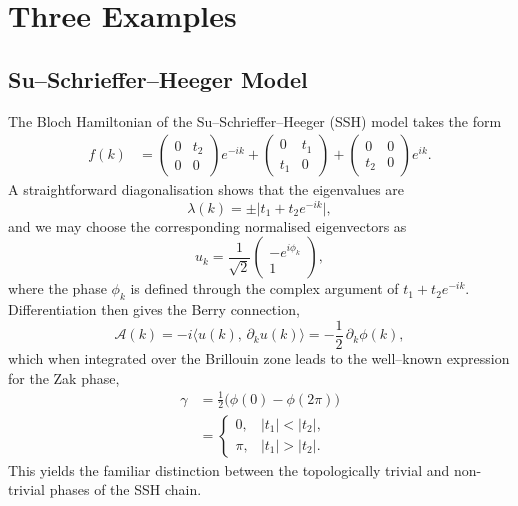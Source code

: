 \documentclass[a4paper,reqno,twoside]{amsart}
\numberwithin{equation}{section}
\theoremstyle{definition}
\newcommand{\<}{\ensuremath \leq}
\renewcommand{\>}{\ensuremath \geq}
\begin{document}
\section{Three Examples}
\subsection{Su–Schrieffer–Heeger Model}
The Bloch Hamiltonian of the Su–Schrieffer–Heeger (SSH) model takes the form
\begin{align}
    f(k) &=
    \begin{pmatrix}
        0 & t_2 \\
        0 & 0
    \end{pmatrix} e^{-ik}
    +
    \begin{pmatrix}
        0 & t_1 \\
        t_1 & 0
    \end{pmatrix}
    +
    \begin{pmatrix}
        0 & 0 \\
        t_2 & 0
    \end{pmatrix} e^{ik}.
\end{align}
A straightforward diagonalisation shows that the eigenvalues are
\begin{equation}
    \lambda(k) = \pm \lvert t_1 + t_2 e^{-ik}\rvert,
\end{equation}
and we may choose the corresponding normalised eigenvectors as
\begin{equation}
    u_k = \frac{1}{\sqrt{2}}
    \begin{pmatrix}
        -e^{i\phi_k} \\
        1
    \end{pmatrix},
\end{equation}
where the phase $\phi_k$ is defined through the complex argument of
$t_1 + t_2 e^{-ik}$.  Differentiation then gives the Berry connection,
\begin{equation}
    \mathcal{A}(k)
    = -i\langle u(k),\, \partial_k u(k) \rangle
    = -\frac{1}{2}\,\partial_k \phi(k),
\end{equation}
which when integrated over the Brillouin zone leads to the well–known expression
for the Zak phase,
\begin{equation}
    \begin{aligned}
        \gamma &= \frac{1}{2}\bigl(\phi(0) - \phi(2\pi)\bigr) \\
        &= 
        \begin{cases}
            0, & \lvert t_1\rvert < \lvert t_2\rvert, \\
            \pi, & \lvert t_1\rvert > \lvert t_2\rvert.
        \end{cases}
    \end{aligned}
\end{equation}
This yields the familiar distinction between the topologically
trivial and non-trivial phases of the SSH chain.
\end{document}
